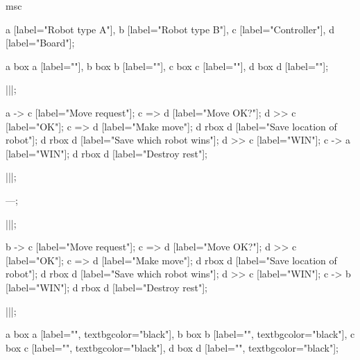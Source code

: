 \begin{msc}
msc
{

a [label="Robot type A"],
b [label="Robot type B"],
c [label="Controller"],
d [label="Board"];

a box a [label=""],
b box b [label=""],
c box c [label=""],
d box d [label=""];

|||;

a -> c [label="Move request"];
c => d [label="Move OK?"];
d >> c [label="OK"];
c => d [label="Make move"];
d rbox d [label="Save location of robot"];
d rbox d [label="Save which robot wins"];
d >> c [label="WIN"];
c -> a [label="WIN"];
d rbox d [label="Destroy rest"];

|||;

---;

|||;

b -> c [label="Move request"];
c => d [label="Move OK?"];
d >> c [label="OK"];
c => d [label="Make move"];
d rbox d [label="Save location of robot"];
d rbox d [label="Save which robot wins"];
d >> c [label="WIN"];
c -> b [label="WIN"];
d rbox d [label="Destroy rest"];

|||;

a box a [label="", textbgcolor="black"],
b box b [label="", textbgcolor="black"],
c box c [label="", textbgcolor="black"],
d box d [label="", textbgcolor="black"];

}
\end{msc}
